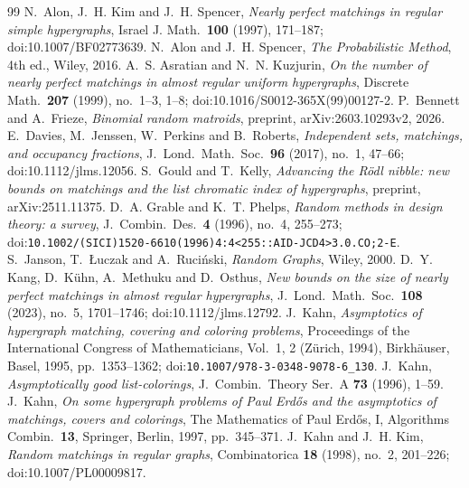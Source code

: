 \documentclass[10pt,a4paper]{amsart}
\begin{document}
\begin{thebibliography}{99}
 N.~Alon, J.~H. Kim and J.~H. Spencer, \emph{Nearly perfect matchings in regular simple hypergraphs}, Israel J. Math.\ \textbf{100} (1997), 171--187; doi:10.1007/BF02773639.
 N.~Alon and J.~H. Spencer, \emph{The Probabilistic Method}, 4th ed., Wiley, 2016.
 A.~S. Asratian and N.~N. Kuzjurin, \emph{On the number of nearly perfect matchings in almost regular uniform hypergraphs}, Discrete Math.\ \textbf{207} (1999), no.~1--3, 1--8; doi:10.1016/S0012-365X(99)00127-2.
 P.~Bennett and A.~Frieze, \emph{Binomial random matroids}, preprint, arXiv:2603.10293v2, 2026.
 E.~Davies, M.~Jenssen, W.~Perkins and B.~Roberts, \emph{Independent sets, matchings, and occupancy fractions}, J.\ Lond.\ Math.\ Soc.\ \textbf{96} (2017), no.~1, 47--66; doi:10.1112/jlms.12056.
 S.~Gould and T.~Kelly, \emph{Advancing the R\"odl nibble: new bounds on matchings and the list chromatic index of hypergraphs}, preprint, arXiv:2511.11375.
 D.~A. Grable and K.~T. Phelps, \emph{Random methods in design theory: a survey}, J.\ Combin.\ Des.\ \textbf{4} (1996), no.~4, 255--273; doi:\nolinkurl{10.1002/(SICI)1520-6610(1996)4:4<255::AID-JCD4>3.0.CO;2-E}.
 S.~Janson, T.~{\L}uczak and A.~Ruci\'nski, \emph{Random Graphs}, Wiley, 2000.
 D.~Y. Kang, D.~K\"uhn, A.~Methuku and D.~Osthus, \emph{New bounds on the size of nearly perfect matchings in almost regular hypergraphs}, J.\ Lond.\ Math.\ Soc.\ \textbf{108} (2023), no.~5, 1701--1746; doi:10.1112/jlms.12792.
 J.~Kahn, \emph{Asymptotics of hypergraph matching, covering and coloring problems}, Proceedings of the International Congress of Mathematicians, Vol.\ 1, 2 (Z\"urich, 1994), Birkh\"auser, Basel, 1995, pp.\ 1353--1362; doi:\nolinkurl{10.1007/978-3-0348-9078-6_130}.
 J.~Kahn, \emph{Asymptotically good list-colorings}, J.\ Combin.\ Theory Ser.\ A \textbf{73} (1996), 1--59.
 J.~Kahn, \emph{On some hypergraph problems of Paul Erd\H{o}s and the asymptotics of matchings, covers and colorings}, The Mathematics of Paul Erd\H{o}s, I, Algorithms Combin.\ \textbf{13}, Springer, Berlin, 1997, pp.\ 345--371.
 J.~Kahn and J.~H. Kim, \emph{Random matchings in regular graphs}, Combinatorica \textbf{18} (1998), no.~2, 201--226; doi:10.1007/PL00009817.

\end{thebibliography}
\end{document}
